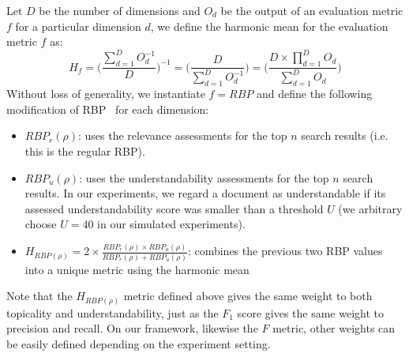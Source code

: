 Let $D$ be the number of dimensions and $O_d$ be the output of an evaluation metric $f$ for a particular dimension $d$, we define the harmonic mean for the evaluation metric $f$ as:
%
\begin{equation}
%
H_f = \Bigg(\frac{\sum\limits_{d=1}^{D} O_d^{-1} }{D} \Bigg)^{-1} = \Bigg(\frac{D}{\sum\limits_{d=1}^{D} O_d^{-1} } \Bigg) = \Bigg(\frac{ D \times \prod\limits_{d=1}^{D} O_d}{\sum\limits_{d=1}^{D} O_d } \Bigg)
%
\label{eq:RBP}
\end{equation}
%
Without loss of generality, we instantiate $f = RBP$ and define the following modification of RBP~\cite{moffat08} for each dimension:
%
\begin{itemize}[leftmargin=*]
	\item $RBP_r(\rho)$: uses the relevance assessments for the top $n$ search results (i.e. this is the regular RBP). 
%	
    \item $RBP_u(\rho)$: uses the understandability assessments for the top $n$ search results. In our experiments, we regard a document as understandable if its assessed understandability score was smaller than a threshold $U$ (we arbitrary choose $U = 40$ in our simulated experiments).
%
    \item $H_{RBP(\rho)} = 2 \times \frac{RBP_r(\rho) \times RBP_u(\rho)}{RBP_r(\rho) + RBP_u(\rho)}$: combines the previous two RBP values into a unique metric using the harmonic mean 
\end{itemize}
%

Note that the $H_{RBP(\rho)}$ metric defined above gives the same weight to both topicality and understandability, just as the $F_1$ score gives the same weight to precision and recall. 
On our framework, likewise the $F$ metric, other weights can be easily defined depending on the experiment setting.



